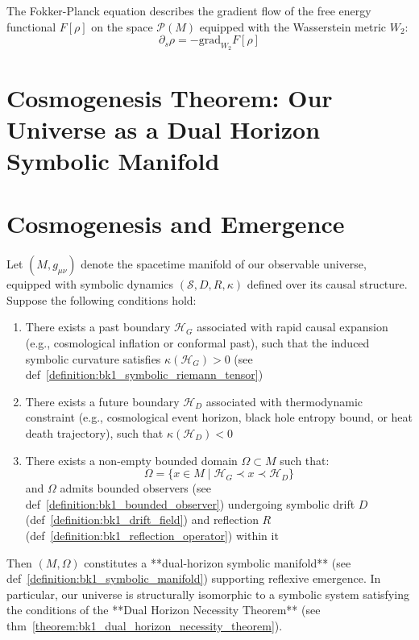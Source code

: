 \begin{corollary}
\label{corollary:bk1_wasserstein_geometric_interpretation}
The Fokker-Planck equation describes the gradient flow of the free energy functional $F[\rho]$ on the space $\mathcal{P}(M)$ equipped with the Wasserstein metric $W_2$:
\[
\partial_s \rho = -\text{grad}_{W_2} F[\rho]
\]
\end{corollary}
\section[Cosmogenesis Theorem]{Cosmogenesis Theorem: Our Universe as a Dual Horizon Symbolic Manifold}
\section*{Cosmogenesis and Emergence}
\label{sec:bk1_cosmogenisis_theorem}

\begin{theorem}
\label{theorem:bk1_dual_horizon_cosmogenesis}
Let $(M, g_{\mu\nu})$ denote the spacetime manifold of our observable universe, equipped with symbolic dynamics $(\mathcal{S}, D, R, \kappa)$ defined over its causal structure. Suppose the following conditions hold:

\begin{enumerate}
    \item There exists a past boundary $\mathcal{H}_G$ associated with rapid causal expansion (e.g., cosmological inflation or conformal past), such that the induced symbolic curvature satisfies $\kappa(\mathcal{H}_G) > 0$ (see def~\ref{definition:bk1_symbolic_riemann_tensor})
    
    \item There exists a future boundary $\mathcal{H}_D$ associated with thermodynamic constraint (e.g., cosmological event horizon, black hole entropy bound, or heat death trajectory), such that $\kappa(\mathcal{H}_D) < 0$
    
    \item There exists a non-empty bounded domain $\Omega \subset M$ such that:
    \[
    \Omega = \{ x \in M \mid \mathcal{H}_G \prec x \prec \mathcal{H}_D \}
    \]
    and $\Omega$ admits bounded observers (see def~\ref{definition:bk1_bounded_observer}) undergoing symbolic drift $D$ (def~\ref{definition:bk1_drift_field}) and reflection $R$ (def~\ref{definition:bk1_reflection_operator}) within it
\end{enumerate}

Then $(M, \Omega)$ constitutes a **dual-horizon symbolic manifold** (see def~\ref{definition:bk1_symbolic_manifold}) supporting reflexive emergence. In particular, our universe is structurally isomorphic to a symbolic system satisfying the conditions of the **Dual Horizon Necessity Theorem** (see thm~\ref{theorem:bk1_dual_horizon_necessity_theorem}).
\end{theorem}

